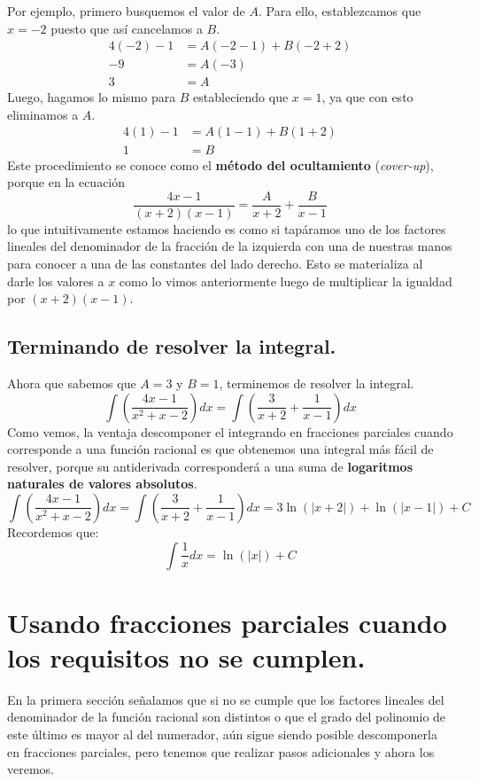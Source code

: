 \documentclass[12pt]{article}
\begin{document}
Por ejemplo, primero busquemos el valor de $A$. Para ello, establezcamos que $x = -2$ puesto que así cancelamos a $B$.
\begin{align*}
  4(-2) - 1 &= A(-2 - 1) + B(-2 + 2) \\
         -9 &= A(-3) \\
          3 &= A
\end{align*}
Luego, hagamos lo mismo para $B$ estableciendo que $x = 1$, ya que con esto eliminamos a $A$.
\begin{align*}
4(1) - 1 &= A(1 - 1) + B(1 + 2) \\
       1 &= B
\end{align*}
Este procedimiento se conoce como el \textbf{método del ocultamiento} (\textit{cover-up}), porque en la ecuación
\[
  \frac{4x - 1}{(x + 2)(x - 1)} = \frac{A}{x + 2} + \frac{B}{x - 1}
\]
lo que intuitivamente estamos haciendo es como si tapáramos uno de los factores lineales del denominador de la fracción de la izquierda con una de nuestras manos para conocer a una de las constantes del lado derecho. Esto se materializa al darle los valores a $x$ como lo vimos anteriormente luego de multiplicar la igualdad por $(x + 2)(x - 1)$.

\subsection{Terminando de resolver la integral.}

Ahora que sabemos que $A = 3$ y $B = 1$, terminemos de resolver la integral.
\[
  \int \left(\frac{4x - 1}{x^{2} + x - 2}\right) dx = \int \left(\frac{3}{x + 2} + \frac{1}{x - 1}\right) dx
\]
Como vemos, la ventaja descomponer el integrando en fracciones parciales cuando corresponde a una función racional es que obtenemos una integral más fácil de resolver, porque su antiderivada corresponderá a una suma de \textbf{logaritmos naturales de valores absolutos}.
\[
  \int \left(\frac{4x - 1}{x^{2} + x - 2}\right) dx = \int \left(\frac{3}{x + 2} + \frac{1}{x - 1}\right) dx
                                                    = 3 \ln(|x + 2|) + \ln(|x - 1|) + C
\]
Recordemos que:
\[
  \int \frac{1}{x} dx = \ln(|x|) + C
\]


\section{Usando fracciones parciales cuando los requisitos no se cumplen.}

En la primera sección señalamos que si no se cumple que los factores lineales del denominador de la función racional son distintos o que el grado del polinomio de este último es mayor al del numerador, aún sigue siendo posible descomponerla en fracciones parciales, pero tenemos que realizar pasos adicionales y ahora los veremos.
\end{document}
